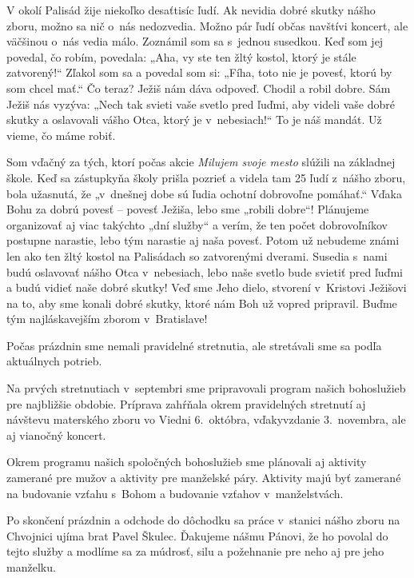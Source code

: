 V okolí Palisád žije niekoľko desaťtisíc ľudí. Ak nevidia dobré skutky nášho zboru, možno sa nič o~nás nedozvedia. Možno pár ľudí občas navštívi koncert, ale väčšinou o~nás vedia málo. Zoznámil som sa s~jednou susedkou. Keď som jej povedal, čo robím, povedala: „Aha, vy ste ten žltý kostol, ktorý je stále zatvorený!“ Zľakol som sa a povedal som si: „Fíha, toto nie je povesť, ktorú by som chcel mať.“ Čo teraz? Ježiš nám dáva odpoveď. Chodil a robil dobre. Sám Ježiš nás vyzýva: „Nech tak svieti vaše svetlo pred ľuďmi, aby videli vaše dobré skutky a oslavovali vášho Otca, ktorý je v~nebesiach!“ To je náš mandát. Už vieme, čo máme robiť.

Som vďačný za tých, ktorí počas akcie {\it Milujem svoje mesto} slúžili na základnej škole. Keď sa zástupkyňa školy prišla pozrieť a videla tam 25 ľudí z~nášho zboru, bola užasnutá, že „v~dnešnej dobe sú ľudia ochotní dobrovoľne pomáhať.“ Vďaka Bohu za dobrú povesť -- povesť Ježiša, lebo sme „robili dobre“! Plánujeme organizovať aj viac takýchto „dní služby“ a verím, že ten počet dobrovoľníkov postupne narastie, lebo tým narastie aj naša povesť. Potom už nebudeme známi len ako ten žltý kostol na Palisádach so zatvorenými dverami. Susedia s~nami budú oslavovať nášho Otca v~nebesiach, lebo naše svetlo bude svietiť pred ľuďmi a budú vidieť naše dobré skutky! Veď sme Jeho dielo, stvorení v~Kristovi Ježišovi na to, aby sme konali dobré skutky, ktoré nám Boh už vopred pripravil. Buďme tým najláskavejším zborom v~Bratislave!



Počas prázdnin sme nemali pravidelné stretnutia, ale stretávali sme sa podľa aktuálnych potrieb.

Na prvých stretnutiach v~septembri sme pripravovali program našich bohoslužieb pre najbližšie obdobie. Príprava zahŕňala okrem pravidelných stretnutí aj návštevu materského zboru vo Viedni 6.~októbra, vďakyvzdanie 3.~novembra, ale aj vianočný koncert.

Okrem programu našich spoločných bohoslužieb sme plánovali aj aktivity zamerané pre mužov a aktivity pre manželské páry.  Aktivity majú byť zamerané na budovanie vzťahu s~Bohom a budovanie vzťahov v~manželstvách.

Po skončení prázdnin a odchode do dôchodku sa práce v~stanici nášho zboru na Chvojnici ujíma brat Pavel Škulec. Ďakujeme nášmu Pánovi, že ho povolal do tejto služby a modlíme sa za múdrosť, silu a požehnanie pre neho aj pre jeho manželku.

